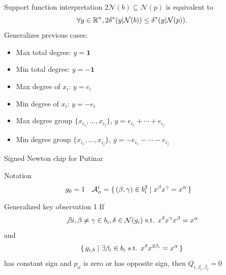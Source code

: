 \documentclass{beamer}
\newcommand{\newtonpoly}[1]{\mathcal{N}(#1)}
\newcommand{\supfun}[2]{\delta^*(#1|#2)}
\begin{document}
\begin{frame}{Support function interpretation}
    $2\newtonpoly{b} \subseteq \newtonpoly{p}$ is equivalent to
    \[ \forall y \in \R^n, 2\supfun{y}{\newtonpoly{b}} \le \supfun{y}{\newtonpoly{p}}. \]
    Generalizes previous cases:
    \begin{itemize}
        \item Max total degree: $y = \mathbf{1}$
        \item Min total degree: $y = -\mathbf{1}$
        \item Max degree of $x_i$: $y = e_i$
        \item Min degree of $x_i$: $y = -e_i$
        \item Max degree group $\{x_{i_1}, \ldots, x_{i_j}\}$, $y = e_{i_1} + \cdots + e_{i_j}$
        \item Min degree group $\{x_{i_1}, \ldots, x_{i_j}\}$, $y = -e_{i_1} - \cdots - e_{i_j}$
    \end{itemize}
\end{frame}

\begin{frame}{Signed Newton chip for Putinar}
    \begin{block}{Notation}
        \begin{align*}
            g_0 & = 1 &
            \mathcal{A}_{\alpha}^i &= \{\, (\beta, \gamma) \in b_i^2 \mid x^\beta x^\gamma = x^\alpha \,\}
        \end{align*}
    \end{block}
    \begin{block}{Generalized key observation 1}
        If
        \[ \not\exists i, \beta \neq \gamma \in b_i, \delta \in \newtonpoly{g_i} \text{ s.t. } x^\delta x^\gamma x^\beta = x^\alpha \]
        and
        \[ \{\, g_{i,\delta} \mid \exists \beta_i \in b_i \text{ s.t. } x^\delta x^{2\beta_i} = x^\alpha \,\} \]
        has constant sign and $p_\alpha$ is zero or has opposite sign,
        then $Q_{i,\beta_i,\beta_i} = 0$
    \end{block}
\end{frame}
\end{document}
